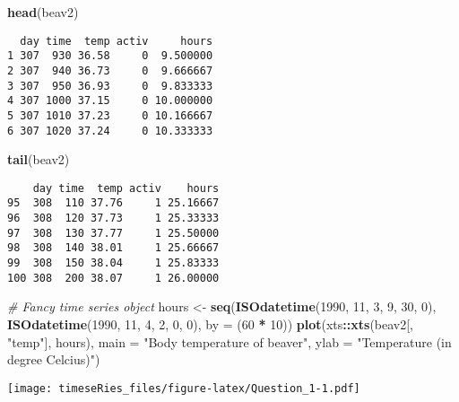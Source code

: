\documentclass[]{book}
\newenvironment{Shaded}{\begin{snugshade}}{\end{snugshade}}
\newcommand{\KeywordTok}[1]{\textcolor[rgb]{0.13,0.29,0.53}{\textbf{#1}}}
\newcommand{\DataTypeTok}[1]{\textcolor[rgb]{0.13,0.29,0.53}{#1}}
\newcommand{\DecValTok}[1]{\textcolor[rgb]{0.00,0.00,0.81}{#1}}
\newcommand{\StringTok}[1]{\textcolor[rgb]{0.31,0.60,0.02}{#1}}
\newcommand{\CommentTok}[1]{\textcolor[rgb]{0.56,0.35,0.01}{\textit{#1}}}
\newcommand{\OperatorTok}[1]{\textcolor[rgb]{0.81,0.36,0.00}{\textbf{#1}}}
\newcommand{\NormalTok}[1]{#1}
\begin{document}
\begin{Shaded}
\begin{Highlighting}[]
\KeywordTok{head}\NormalTok{(beav2)}
\end{Highlighting}
\end{Shaded}

\begin{verbatim}
  day time  temp activ     hours
1 307  930 36.58     0  9.500000
2 307  940 36.73     0  9.666667
3 307  950 36.93     0  9.833333
4 307 1000 37.15     0 10.000000
5 307 1010 37.23     0 10.166667
6 307 1020 37.24     0 10.333333
\end{verbatim}

\begin{Shaded}
\begin{Highlighting}[]
\KeywordTok{tail}\NormalTok{(beav2)}
\end{Highlighting}
\end{Shaded}

\begin{verbatim}
    day time  temp activ    hours
95  308  110 37.76     1 25.16667
96  308  120 37.73     1 25.33333
97  308  130 37.77     1 25.50000
98  308  140 38.01     1 25.66667
99  308  150 38.04     1 25.83333
100 308  200 38.07     1 26.00000
\end{verbatim}

\begin{Shaded}
\begin{Highlighting}[]
\CommentTok{# Fancy time series object}
\NormalTok{hours <-}\StringTok{ }\KeywordTok{seq}\NormalTok{(}\KeywordTok{ISOdatetime}\NormalTok{(}\DecValTok{1990}\NormalTok{, }\DecValTok{11}\NormalTok{, }\DecValTok{3}\NormalTok{, }\DecValTok{9}\NormalTok{, }\DecValTok{30}\NormalTok{, }\DecValTok{0}\NormalTok{), }\KeywordTok{ISOdatetime}\NormalTok{(}\DecValTok{1990}\NormalTok{, }\DecValTok{11}\NormalTok{, }\DecValTok{4}\NormalTok{, }\DecValTok{2}\NormalTok{, }
    \DecValTok{0}\NormalTok{, }\DecValTok{0}\NormalTok{), }\DataTypeTok{by =}\NormalTok{ (}\DecValTok{60} \OperatorTok{*}\StringTok{ }\DecValTok{10}\NormalTok{))}
\KeywordTok{plot}\NormalTok{(xts}\OperatorTok{::}\KeywordTok{xts}\NormalTok{(beav2[, }\StringTok{"temp"}\NormalTok{], hours), }\DataTypeTok{main =} \StringTok{"Body temperature of beaver"}\NormalTok{, }
    \DataTypeTok{ylab =} \StringTok{"Temperature (in degree Celcius)"}\NormalTok{)}
\end{Highlighting}
\end{Shaded}

\texttt{[image: timeseRies\_files/figure-latex/Question\_1-1.pdf]}
\end{document}
